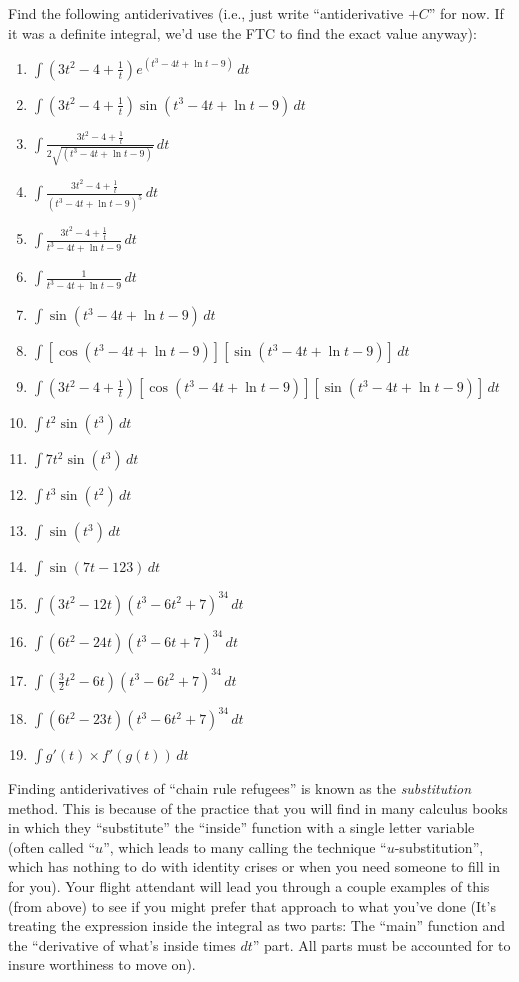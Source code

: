 \documentclass{ximera}
\begin{document}
\begin{problem}
Find the following antiderivatives (i.e., just write ``antiderivative $+C$'' for now.  If it was a definite integral, we'd use the FTC to find the exact value anyway):
\begin{enumerate}
    \item $\int \left ( 3t^2 - 4 + \frac{1}{t} \right) e^{(t^3 - 4t+\ln t -9)}\, dt$
    \item $\int \left ( 3t^2 - 4 + \frac{1}{t} \right) \sin(t^3 - 4t+\ln t -9)\, dt$
    \item $\int \frac{ 3t^2 - 4 + \frac{1}{t}}{2\sqrt{(t^3 - 4t+\ln t -9)}}\, dt$
    \item $\int \frac{ 3t^2 - 4 + \frac{1}{t}}{(t^3 - 4t+\ln t -9)^5}\, dt$
    \item $\int \frac{ 3t^2 - 4 + \frac{1}{t}}{t^3 - 4t+\ln t -9}\, dt$
    \item $\int \frac{1}{t^3 - 4t+\ln t -9}\, dt $
    \item $\int \sin(t^3-4t+\ln t - 9) \, dt$
    \item $\int [\cos(t^3-4t+\ln t - 9)][\sin(t^3-4t+\ln t - 9)] \, dt $
    \item $\int \left ( 3t^2 - 4 + \frac{1}{t} \right ) [\cos(t^3-4t+\ln t - 9)][\sin(t^3-4t+\ln t - 9)] \, dt$
    \item $\int t^2 \sin(t^3)\, dt$
    \item $\int 7t^2 \sin(t^3)\, dt$
    \item $\int t^3 \sin(t^2) \, dt$
    \item $\int \sin(t^3)\, dt$
    \item $\int \sin(7t-123)\, dt$
    \item $\int (3t^2-12t)(t^3-6t^2+7)^{34}\, dt$
    \item $\int (6t^2-24t)(t^3-6t+7)^{34}\, dt$
    \item $\int \left ( \frac{3}{2}t^2-6t \right) (t^3-6t^2+7)^{34}\, dt$
    \item $\int (6t^2-23t)(t^3-6t^2+7)^{34}\, dt$
    \item $\int g'(t) \times f'(g(t)) \, dt$
\end{enumerate}

\end{problem}

Finding antiderivatives of ``chain rule refugees'' is known as the {\em substitution} method.  This is because of the practice that you will find in many calculus books in which they ``substitute'' the ``inside'' function with a single letter variable (often called ``$u$'', which leads to many calling the technique ``$u$-substitution'', which has nothing to do with identity crises or when you need someone to fill in for you).  Your flight attendant will lead you through a couple examples of this (from above) to see if you might prefer that approach to what you've done (It's treating the expression inside the integral as two parts:  The ``main'' function and the ``derivative of what's inside times $dt$'' part.  All parts must be accounted for to insure worthiness to move on). 
\end{document}

